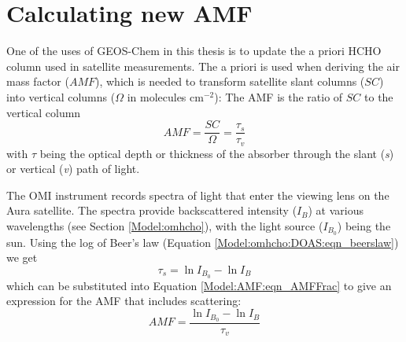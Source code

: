 \section{Calculating new AMF}
  \label{Model:AMF}
  
  One of the uses of GEOS-Chem in this thesis is to update the a priori HCHO column used in satellite measurements.
  The a priori is used when deriving the air mass factor ($AMF$), which is needed to transform satellite slant columns ($SC$) into vertical columns ($\Omega$ in molecules cm$^{-2}$):
  The AMF is the ratio of $SC$ to the vertical column
  \begin{equation} \label{Model:AMF:eqn_AMFFrac}
    AMF=\frac{SC}{\Omega} = \frac{\tau_s}{\tau_v}
  \end{equation}
  with $\tau$ being the optical depth or thickness of the absorber through the slant (\textit{s}) or vertical (\textit{v}) path of light.
  
  
  The OMI instrument records spectra of light that enter the viewing lens on the Aura satellite.
  The spectra provide backscattered intensity ($I_B$) at various wavelengths (see Section \ref{Model:omhcho}), with the light source ($I_{B_0}$) being the sun. 
  Using the log of Beer's law (Equation \ref{Model:omhcho:DOAS:eqn_beerslaw}) we get 
  $$ \tau_s = \ln{I_{B_0}} - \ln{I_B} $$
  which can be substituted into Equation \ref{Model:AMF:eqn_AMFFrac} to give an expression for the AMF that includes scattering:
  \begin{equation} \label{Model:AMF:eqn_amfscattering}
    AMF = \frac{\ln{I_{B_0}}-\ln{I_B}}{\tau_v}
  \end{equation}
  
